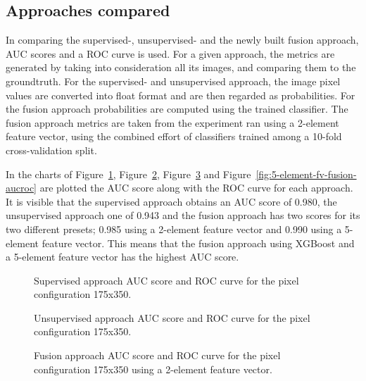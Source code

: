 \subsection{Approaches compared}
In comparing the supervised-, unsupervised- and the newly built fusion approach, AUC scores and a ROC curve is used. For a given approach, the metrics are generated by taking into consideration all its images, and comparing them to the groundtruth. For the supervised- and unsupervised approach, the image pixel values are converted into float format and are then regarded as probabilities. For the fusion approach probabilities are computed using the trained classifier. The fusion approach metrics are taken from the experiment ran using a 2-element feature vector, using the combined effort of classifiers trained among a 10-fold cross-validation split.

In the charts of Figure~\ref{fig:supervised-aucroc}, Figure~\ref{fig:unsupervised-aucroc}, Figure~\ref{fig:fusion-aucroc} and Figure~\ref{fig:5-element-fv-fusion-aucroc} are plotted the AUC score along with the ROC curve for each approach. It is visible that the supervised approach obtains an AUC score of 0.980, the unsupervised approach one of 0.943 and the fusion approach has two scores for its two different presets; 0.985 using a 2-element feature vector and 0.990 using a 5-element feature vector. This means that the fusion approach using XGBoost and a 5-element feature vector has the highest AUC score.

\begin{figure}[ht]
  \centering
  
  \caption{Supervised approach AUC score and ROC curve for the pixel configuration 175x350.
  }\label{fig:supervised-aucroc}
\end{figure}

\begin{figure}[ht]
  \centering
  
  \caption{Unsupervised approach AUC score and ROC curve for the pixel configuration 175x350.
  }\label{fig:unsupervised-aucroc}
\end{figure}

\begin{figure}[ht]
  \centering
  
  \caption{Fusion approach AUC score and ROC curve for the pixel configuration 175x350 using a 2-element feature vector.
  }\label{fig:fusion-aucroc}
\end{figure}

